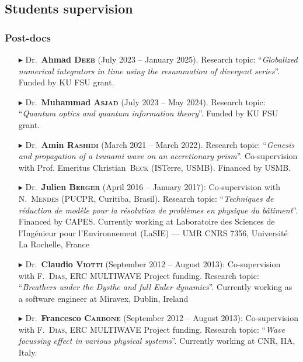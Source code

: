     \separator
    \subsection{Students supervision}

        \subsubsection{Post-docs}
        \begin{itemize}
          \item[$\blacktriangleright$] Dr.~\textbf{Ahmad \textsc{Deeb}} (July 2023 -- January 2025). Research topic: ``\textit{Globalized numerical integrators in time using the resummation of divergent series}''. Funded by KU FSU grant.
          \item[$\blacktriangleright$] Dr.~\textbf{Muhammad \textsc{Asjad}} (July 2023 -- May 2024). Research topic: ``\textit{Quantum optics and quantum information theory}''. Funded by KU FSU grant.
          \item[$\blacktriangleright$] Dr.~\textbf{Amin \textsc{Rashidi}} (March 2021 -- March 2022). Research topic: ``\textit{Genesis and propagation of a tsunami wave on an accretionary prism}''. Co-supervision with Prof. Emeritus Christian~\textsc{Beck} (ISTerre, USMB). Financed by USMB.
          \item[$\blacktriangleright$] Dr.~\textbf{Julien \textsc{Berger}} (April 2016 -- January 2017): Co-supervision with N.~\textsc{Mendes} (PUCPR, Curitiba, Brasil). Research topic: ``\textit{Techniques de r\'eduction de mod\`ele pour la r\'esolution de probl\`emes en physique du b\^atiment}''. Financed by CAPES. Currently working at Laboratoire des Sciences de l'Ing\'enieur pour l'Environnement (LaSIE) --- UMR CNRS 7356, Universit\'e La Rochelle, France
          \item[$\blacktriangleright$] Dr.~\textbf{Claudio \textsc{Viotti}} (September 2012 -- August 2013): Co-supervision with F.~\textsc{Dias}, ERC MULTIWAVE Project funding. Research topic: ``\textit{Breathers under the Dysthe and full Euler dynamics}''. Currently working as a software engineer at Miravex, Dublin, Ireland
          \item[$\blacktriangleright$] Dr.~\textbf{Francesco \textsc{Carbone}} (September 2012 -- August 2013): Co-supervision with F.~\textsc{Dias}, ERC MULTIWAVE Project funding. Research topic: ``\textit{Wave focussing effect in various physical systems}''. Currently working at CNR, IIA, Italy.
        \end{itemize}

